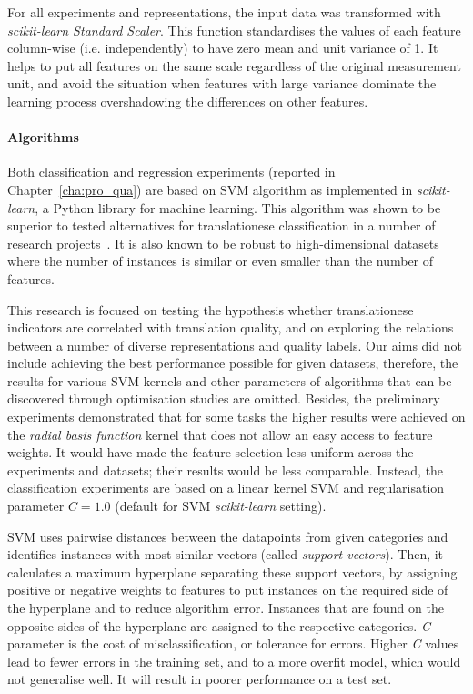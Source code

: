 For all experiments and representations, the input data was transformed with \textit{scikit-learn Standard Scaler}. This function standardises the values of each feature column-wise (i.e. independently) to have zero mean and unit variance of 1. It helps to put all features on the same scale regardless of the original measurement unit, and avoid the situation when features with large variance dominate the learning process overshadowing the differences on other features.

\paragraph{Algorithms} Both classification and regression experiments (reported in Chapter~\ref{cha:pro_qua}) are based on \gls{SVM} algorithm as implemented in \textit{scikit-learn}, a Python library for machine learning. 
This algorithm was shown to be superior to tested alternatives for translationese classification in a number of research projects~\cite[see, for example,][]{Ilisei2010}. It is also known to be robust to high-dimensional datasets where the number of instances is similar or even smaller than the number of features.

This research is focused on testing the hypothesis whether translationese indicators are correlated with translation quality, and on exploring the relations between a number of diverse representations and quality labels. Our aims did not include achieving the best performance possible for given datasets, therefore, the results for various SVM kernels and other parameters of algorithms that can be discovered through optimisation studies are omitted. Besides, the preliminary experiments demonstrated that for some tasks the higher results were achieved on the \textit{radial basis function} kernel that does not allow an easy access to feature weights. It would have made the feature selection less uniform across the experiments and datasets; their results would be less comparable. 
Instead, the classification experiments are based on a linear kernel SVM and regularisation parameter $C=1.0$ (default for SVM \textit{scikit-learn} setting).

SVM uses pairwise distances between the datapoints from given categories and identifies instances with most similar vectors (called \textit{support vectors}). Then, it calculates a maximum hyperplane separating these support vectors, by assigning positive or negative weights to features to put instances on the required side of the hyperplane and to reduce algorithm error. Instances that are found on the opposite sides of the hyperplane are assigned to the respective categories. 
\textit{C} parameter is the cost of misclassification, or tolerance for errors. Higher \textit{C} values lead to fewer errors in the training set, and to a more overfit model, which would not generalise well. It will result in poorer performance on a test set.
%

